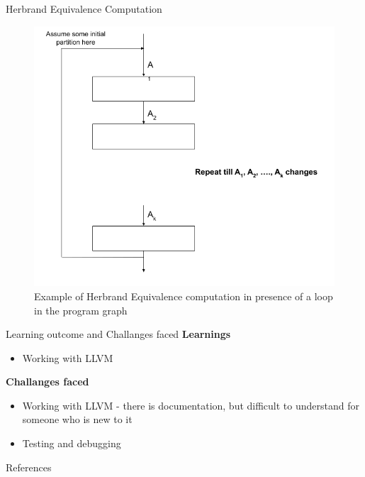 \documentclass[11pt]{beamer}
\begin{document}
\begin{frame}{Herbrand Equivalence Computation}
    \begin{figure}[!h]
        \centering
        \includegraphics[scale=0.3]{HerbrandEquivalenceLoop.png}
        \caption{Example of Herbrand Equivalence computation in presence of a loop in the program graph}
        \label{fig:herbrandExample}
    \end{figure}
\end{frame}

\begin{frame}{Learning outcome and Challanges faced}
    \textbf{Learnings}
    \begin{itemize}
        \item Working with LLVM
    \end{itemize}
    \textbf{Challanges faced}
    \begin{itemize}
        \item Working with LLVM - there is documentation, but difficult to understand for someone who is new to it
        \item Testing and debugging
    \end{itemize}
\end{frame}

\begin{frame}{References}


\end{frame}
\end{document}
